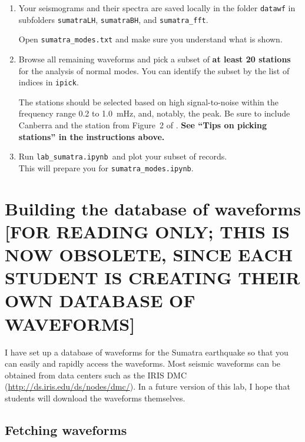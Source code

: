 \documentclass[11pt,titlepage,fleqn]{article}
\newcommand{\tfile}{{\tt lab\_sumatra.ipynb}}
\begin{document}
\begin{enumerate}
\item Your seismograms and their spectra are saved locally in the folder \verb+datawf+ in subfolders \verb+sumatraLH+, \verb+sumatraBH+, and \verb+sumatra_fft+.

Open \verb+sumatra_modes.txt+ and make sure you understand what is shown.

\item Browse all remaining waveforms and pick a subset of {\bf at least 20 stations} for the analysis of normal modes. You can identify the subset by the list of indices in \verb+ipick+.

%
%
The stations should be selected based on high signal-to-noise within the frequency range 0.2 to 1.0~mHz, and, notably, the  peak. Be sure to include Canberra and the station from Figure~2 of \citet{Park2005}.
{\bf See ``Tips on picking stations'' in the instructions above.}

\item Run \tfile\ and plot your subset of records. \\
This will prepare you for \verb+sumatra_modes.ipynb+.

\end{enumerate}


\iffalse

\section{Building the database of waveforms [FOR READING ONLY; THIS IS NOW OBSOLETE, SINCE EACH STUDENT IS CREATING THEIR OWN DATABASE OF WAVEFORMS]}

I have set up a database of waveforms for the Sumatra earthquake so that you can easily and rapidly access the waveforms. Most seismic waveforms can be obtained from data centers such as the IRIS DMC (\url{http://ds.iris.edu/ds/nodes/dmc/}). In a future version of this lab, I hope that students will download the waveforms themselves.

\subsection{Fetching waveforms}
\end{document}
